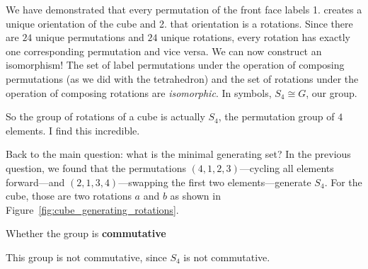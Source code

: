 \documentclass[../gatm_answers.tex]{subfiles}
\begin{document}
\noindent We have demonstrated that every permutation of the front face labels 1. creates a unique orientation of the cube and 2. that orientation is a rotations. Since there are $24$ unique permutations and $24$ unique rotations, every rotation has exactly one corresponding permutation and vice versa. We can now construct an isomorphism! The set of label permutations under the operation of composing permutations (as we did with the tetrahedron) and the set of rotations under the operation of composing rotations are \textit{isomorphic}. In symbols, $S_4\cong G$, our group.

So the group of rotations of a cube is actually $S_4$, the permutation group of $4$ elements. I find this incredible.

Back to the main question: what is the minimal generating set? In the previous question, we found that the permutations $(4,1,2,3)$---cycling all elements forward---and $(2,1,3,4)$---swapping the first two elements---generate $S_4$. For the cube, those are two rotations $a$ and $b$ as shown in Figure~\ref{fig:cube_generating_rotations}.

\begin{inner_problem}
\item Whether the group is \textbf{commutative}
\end{inner_problem}

\noindent This group is not commutative, since $S_4$ is not commutative.
\end{document}
